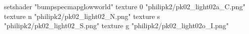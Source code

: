 setshader "bumpspecmapglowworld"
    texture 0 "philipk2/pk02_light02a_C.png"
    texture n "philipk2/pk02_light02_N.png"
    texture s "philipk2/pk02_light02_S.png"
    texture g "philipk2/pk02_light02o_I.png"